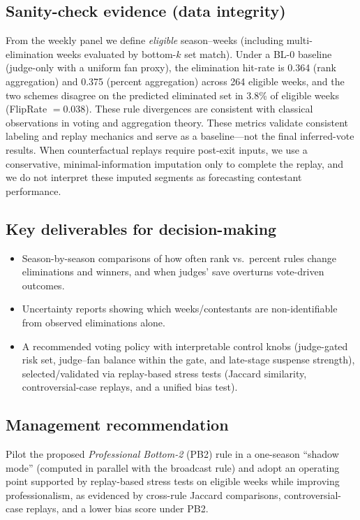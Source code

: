 \subsection*{Sanity-check evidence (data integrity)}
From the weekly panel we define \emph{eligible} season--weeks (including multi-elimination weeks evaluated by bottom-$k$ set match).
Under a BL-0 baseline (judge-only with a uniform fan proxy), the elimination hit-rate is 0.364 (rank aggregation) and 0.375 (percent aggregation)
across 264 eligible weeks, and the two schemes disagree on the predicted eliminated set in 3.8\% of eligible weeks (FlipRate $=0.038$).
These rule divergences are consistent with classical observations in voting and aggregation theory.\cite{saari2001decisions}
These metrics validate consistent labeling and replay mechanics and serve as a baseline---not the final inferred-vote results. When counterfactual replays require post-exit inputs, we use a conservative, minimal-information imputation
only to complete the replay, and we do not interpret these imputed segments as forecasting contestant performance.

\subsection*{Key deliverables for decision-making}
\begin{itemize}
    \item Season-by-season comparisons of how often rank vs.\ percent rules change eliminations and winners, and when judges' save overturns vote-driven outcomes.
    \item Uncertainty reports showing which weeks/contestants are non-identifiable from observed eliminations alone.
    \item A recommended voting policy with interpretable control knobs (judge-gated risk set, judge--fan balance within the gate, and late-stage suspense strength),
    selected/validated via replay-based stress tests (Jaccard similarity, controversial-case replays, and a unified bias test).
\end{itemize}

\subsection*{Management recommendation}
Pilot the proposed \textit{Professional Bottom-2} (PB2) rule in a one-season ``shadow mode'' (computed in parallel with the broadcast rule) and adopt an operating point supported by replay-based stress tests
on eligible weeks while improving professionalism, as evidenced by cross-rule Jaccard comparisons, controversial-case replays, and a lower bias score under PB2.
